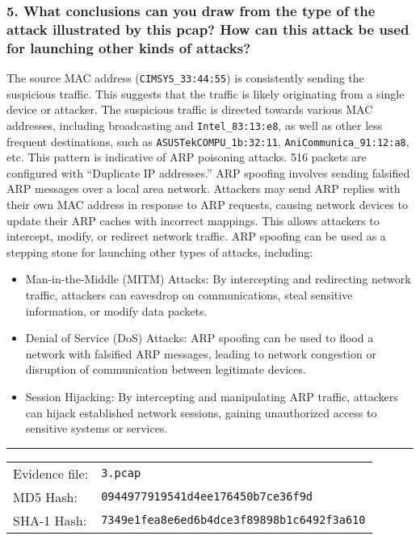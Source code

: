 \subsubsection*{5. What conclusions can you draw from the type of the attack illustrated by this pcap? How can this attack be used for launching other kinds of attacks?}
The source MAC address (\texttt{CIMSYS\_33:44:55}) is consistently sending the suspicious traffic. This suggests that the traffic is likely originating from a single device or attacker. The suspicious traffic is directed towards various MAC addresses, including broadcasting and \texttt{Intel\_83:13:e8}, as well as other less frequent destinations, such as \texttt{ASUSTekCOMPU\_1b:32:11}, \texttt{AniCommunica\_91:12:a8}, etc. This pattern is indicative of ARP poisoning attacks. 516 packets are configured with “Duplicate IP addresses.” ARP spoofing involves sending falsified ARP messages over a local area network. Attackers may send ARP replies with their own MAC address in response to ARP requests, causing network devices to update their ARP caches with incorrect mappings. This allows attackers to intercept, modify, or redirect network traffic. ARP spoofing can be used as a stepping stone for launching other types of attacks, including:
\begin{itemize}
	\item Man-in-the-Middle (MITM) Attacks: By intercepting and redirecting network traffic, attackers can eavesdrop on communications, steal sensitive information, or modify data packets. 
	\item Denial of Service (DoS) Attacks: ARP spoofing can be used to flood a network with falsified ARP messages, leading to network congestion or disruption of communication between legitimate devices.
	\item Session Hijacking: By intercepting and manipulating ARP traffic, attackers can hijack established network sessions, gaining unauthorized access to sensitive systems or services.\cite{detectingARP}
\end{itemize} 

\noindent\rule{\textwidth}{1pt}
\vspace{-0.8cm}
\begin{table}[h]
\begin{tabular}{ll}
Evidence file: & \texttt{3.pcap}                                 \\
MD5 Hash:      & \texttt{0944977919541d4ee176450b7ce36f9d}         \\
SHA-1 Hash:    & \texttt{7349e1fea8e6ed6b4dce3f89898b1c6492f3a610}
\end{tabular}
\end{table}
\vspace{-0.8cm}

